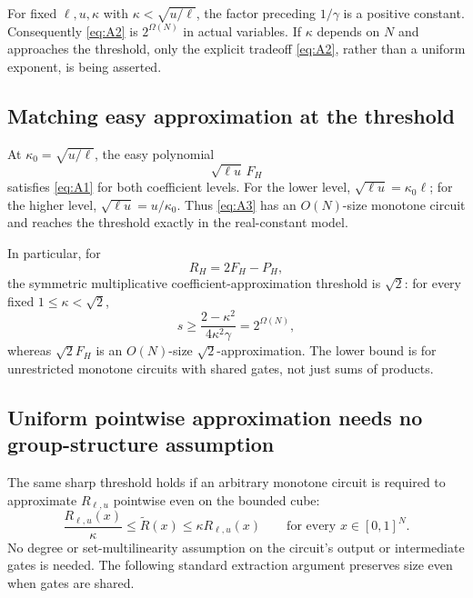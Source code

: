 \documentclass[11pt]{article}
\theoremstyle{definition}
\theoremstyle{remark}
\numberwithin{equation}{section}
\begin{document}
For fixed \(\ell,u,\kappa\) with \(\kappa<\sqrt{u/\ell}\), the
factor preceding \(1/\gamma\) is a positive constant.
Consequently \eqref{eq:A2} is \(2^{\Omega(N)}\) in actual variables.
If \(\kappa\) depends on \(N\) and approaches the threshold,
only the explicit tradeoff \eqref{eq:A2}, rather than a uniform exponent,
is being asserted.

\subsection{Matching easy approximation at the threshold}

At \(\kappa_0=\sqrt{u/\ell}\), the easy polynomial
\begin{equation}\label{eq:A3}
\sqrt{\ell u}\,F_H
\end{equation}
satisfies \eqref{eq:A1} for both coefficient levels. For the lower level,
\(\sqrt{\ell u}=\kappa_0\ell\); for the higher level,
\(\sqrt{\ell u}=u/\kappa_0\).
Thus \eqref{eq:A3} has an \(O(N)\)-size monotone circuit and reaches
the threshold exactly in the real-constant model.

In particular, for
\[
                              R_H=2F_H-P_H,
\]
the symmetric multiplicative coefficient-approximation threshold
is \(\sqrt2\): for every fixed \(1\le\kappa<\sqrt2\),
\begin{equation}\label{eq:A4}
s\ge\frac{2-\kappa^2}{4\kappa^2\gamma}
                         =2^{\Omega(N)},
\end{equation}
whereas \(\sqrt2 F_H\) is an \(O(N)\)-size \(\sqrt2\)-approximation.
The lower bound is for unrestricted monotone circuits with
shared gates, not just sums of products.

\subsection{Uniform pointwise approximation needs no group-structure assumption}

The same sharp threshold holds if an arbitrary monotone circuit
is required to approximate \(R_{\ell,u}\) pointwise even on the
bounded cube:
\begin{equation}\label{eq:A5}
\frac{R_{\ell,u}(x)}{\kappa}\le \widetilde R(x)
                   \le\kappa R_{\ell,u}(x)
                       \qquad\text{for every }x\in[0,1]^N.
\end{equation}
No degree or set-multilinearity assumption on the circuit's output
or intermediate gates is needed. The following standard extraction argument
\cite{JerrumSnir1982,Jukna2016} preserves size even when gates are shared.
\end{document}

